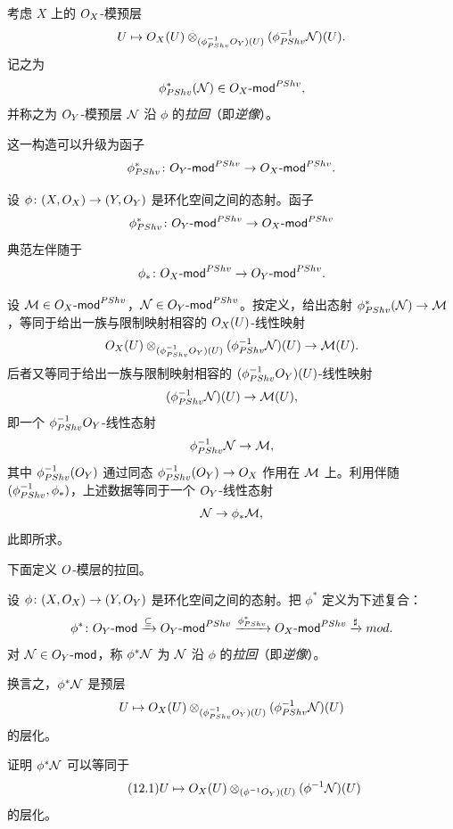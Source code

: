 考虑 $X$ 上的 $O_X$-模预层
\[
U\mapsto O_X(U)\otimes_{(\phi^{-1}_{PShv}O_Y)(U)}(\phi^{-1}_{PShv}\mathcal{N})(U).
\]
记之为
\[
\phi^{*}_{PShv}(\mathcal{N})\in O_X\text{-}\mathsf{mod}^{PShv},
\]
并称之为 $O_Y$-模预层 $\mathcal{N}$ 沿 $\phi$ 的\emph{拉回}（即\emph{逆像}）。

这一构造可以升级为函子
\[
\phi^*_{PShv}\colon O_Y\text{-}\mathsf{mod}^{PShv}\to O_X\text{-}\mathsf{mod}^{PShv}.
\]

\begin{proposition}\label{prop:12.3.4}
设 $\phi\colon(X,O_X)\to(Y,O_Y)$ 是环化空间之间的态射。函子
\[
\phi^*_{PShv}\colon O_Y\text{-}\mathsf{mod}^{PShv}\to O_X\text{-}\mathsf{mod}^{PShv}
\]
典范左伴随于
\[
\phi_*\colon O_X\text{-}\mathsf{mod}^{PShv}\to O_Y\text{-}\mathsf{mod}^{PShv}.
\]
\end{proposition}

\begin{sketch}
设 $\mathcal{M}\in O_X\text{-}\mathsf{mod}^{PShv}$，$\mathcal{N}\in O_Y\text{-}\mathsf{mod}^{PShv}$。按定义，给出态射 $\phi^*_{PShv}(\mathcal{N})\to\mathcal{M}$，等同于给出一族与限制映射相容的 $O_X(U)$-线性映射
\[
O_X(U)\otimes_{(\phi^{-1}_{PShv}O_Y)(U)}(\phi^{-1}_{PShv}\mathcal{N})(U)\to\mathcal{M}(U).
\]
后者又等同于给出一族与限制映射相容的 $(\phi^{-1}_{PShv}O_Y)(U)$-线性映射
\[
(\phi^{-1}_{PShv}\mathcal{N})(U)\to\mathcal{M}(U),
\]
即一个 $\phi^{-1}_{PShv}O_Y$-线性态射
\[
\phi^{-1}_{PShv}\mathcal{N}\to\mathcal{M},
\]
其中 $\phi^{-1}_{PShv}(O_Y)$ 通过同态 $\phi^{-1}_{PShv}(O_Y)\to O_X$ 作用在 $\mathcal{M}$ 上。利用伴随 $(\phi^{-1}_{PShv},\phi_*)$，上述数据等同于一个 $O_Y$-线性态射
\[
\mathcal{N}\to\phi_*\mathcal{M},
\]
此即所求。
\end{sketch}

下面定义 $O$-模层的拉回。

\begin{construction}\label{con:12.3.5}
设 $\phi\colon(X,O_X)\to(Y,O_Y)$ 是环化空间之间的态射。把 $\phi^*$ 定义为下述复合：
\[
\phi^*\colon O_Y\text{-}\mathsf{mod}\xrightarrow{\subseteq}O_Y\text{-}\mathsf{mod}^{PShv}\xrightarrow{\phi^*_{PShv}}O_X\text{-}\mathsf{mod}^{PShv}\xrightarrow{\sharp}mod.
\]
对 $\mathcal{N}\in O_Y\text{-}\mathsf{mod}$，称 $\phi^*\mathcal{N}$ 为 $\mathcal{N}$ 沿 $\phi$ 的\emph{拉回}（即\emph{逆像}）。

换言之，$\phi^*\mathcal{N}$ 是预层
\[
U\mapsto O_X(U)\otimes_{(\phi^{-1}_{PShv}O_Y)(U)}(\phi^{-1}_{PShv}\mathcal{N})(U)
\]
的层化。
\end{construction}

\begin{exercise}\label{exc:12.3.6}
证明 $\phi^*\mathcal{N}$ 可以等同于
\begin{equation}\tag{12.1}\label{eq:12.1}
U\mapsto O_X(U)\otimes_{(\phi^{-1}O_Y)(U)}(\phi^{-1}\mathcal{N})(U)
\end{equation}
的层化。
\end{exercise}


